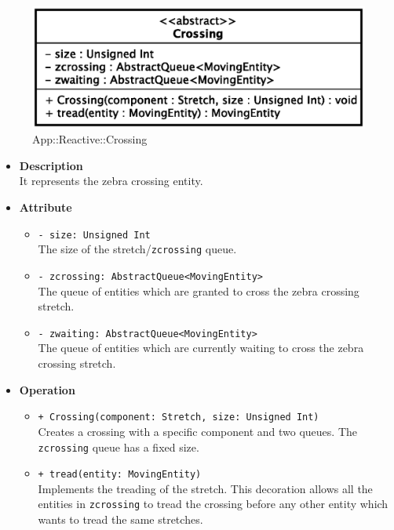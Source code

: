 \begin{figure}[h]
\centering
\includegraphics[scale=0.6,keepaspectratio]{images/solution/crossing.eps}
\caption{App::Reactive::Crossing}
\label{fig:sd-app-crossing}
\end{figure}
\FloatBarrier
\begin{itemize}
  \item \textbf{Description} \\
    It represents the zebra crossing entity. 
  \item \textbf{Attribute}
  \begin{itemize}
    \item \texttt{- size: Unsigned Int} \\
The size of the stretch/\texttt{zcrossing} queue.
    \item \texttt{- zcrossing: AbstractQueue<MovingEntity>} \\
The queue of entities which are granted to cross the zebra crossing stretch.
  \item \texttt{- zwaiting: AbstractQueue<MovingEntity>} \\
The queue of entities which are currently waiting to cross the zebra crossing stretch.
  \end{itemize}
\item \textbf{Operation}
  \begin{itemize}
    \item \texttt{+ Crossing(component: Stretch, size: Unsigned Int)} \\
Creates a crossing with a specific component and two queues. The
\texttt{zcrossing} queue has a fixed size.
    \item \texttt{+ tread(entity: MovingEntity)} \\
Implements the treading of the stretch. This decoration allows all the
entities in \texttt{zcrossing} to tread the crossing before any other entity
which wants to tread the same stretches.
  \end{itemize}
\end{itemize}
